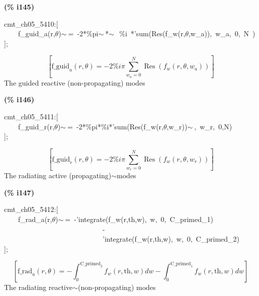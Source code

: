 \documentclass[fleqn]{article}
\begin{document}
\noindent
\begin{minipage}[t]{4.000000em}\color{red}\bfseries
(\% i145)	
\end{minipage}
\begin{minipage}[t]{\textwidth}\color{blue}
cmt\_ch05\_5410:[\\
\ \ \ \ f\_guid\_a(r,\ensuremath{\theta})\ensuremath{\sim\ }=\ -2*\%pi\ensuremath{\sim\ }*\ensuremath{\sim\ }\ \%i\ *'sum(Res(f\_w(r,\ensuremath{\theta},w\_a)),\ w\_a,\ 0,\ N\ )\\
];
\end{minipage}
\[\displaystyle \tag{\% o145} 
\left[ {{\ensuremath{\mathrm{f\_ guid}}}_a}\left( r\operatorname{,}\theta \right) =-2 \% i \ensuremath{\pi}  \sum_{{w_a}=0}^{N}{\left. \operatorname{Res}\left( {f_w}\left( r\operatorname{,}\theta \operatorname{,}{w_a}\right) \right) \right.}\right] \mbox{}
\]
The guided reactive (non-propagating) modes


\noindent
\begin{minipage}[t]{4.000000em}\color{red}\bfseries
(\% i146)	
\end{minipage}
\begin{minipage}[t]{\textwidth}\color{blue}
cmt\_ch05\_5411:[\\
\ \ \ \ f\_guid\_r(r,\ensuremath{\theta})\ensuremath{\sim\ }=\ -2*\%pi*\%i*'sum(Res(f\_w(r,\ensuremath{\theta},w\_r))\ensuremath{\sim\ },\ w\_r,\ 0,N)\\
];
\end{minipage}
\[\displaystyle \tag{\% o146} 
\left[ {{\ensuremath{\mathrm{f\_ guid}}}_r}\left( r\operatorname{,}\theta \right) =-2 \% i \ensuremath{\pi}  \sum_{{w_r}=0}^{N}{\left. \operatorname{Res}\left( {f_w}\left( r\operatorname{,}\theta \operatorname{,}{w_r}\right) \right) \right.}\right] \mbox{}
\]
The radiating active (propagating)\ensuremath{\sim }modes


\noindent
\begin{minipage}[t]{4.000000em}\color{red}\bfseries
(\% i147)	
\end{minipage}
\begin{minipage}[t]{\textwidth}\color{blue}
cmt\_ch05\_5412:[\\
\ \ \ \ f\_rad\_a(r,\ensuremath{\theta})\ensuremath{\sim\ }=\ -'integrate(f\_w(r,th,w),\ w,\ 0,\ C\_primed\_1)\\
\ \ \ \ \ \ \ \ \ \ \ \ \ \ \ \ \ \ \ \ \ \ \ \ \ \ \ \ -\\
\ \ \ \ \ \ \ \ \ \ \ \ \ \ \ \ \ \ \ \ \ \ \ \ \ \ \ \ 'integrate(f\_w(r,th,w),\ w,\ 0,\ C\_primed\_2)\\
];
\end{minipage}
\[\displaystyle \tag{\% o147} 
\left[ {{\ensuremath{\mathrm{f\_ rad}}}_a}\left( r\operatorname{,}\theta \right) =-\int_{0}^{{{\ensuremath{\mathrm{C\_ primed}}}_2}}{\left. {f_w}\left( r\operatorname{,}\ensuremath{\mathrm{th}}\operatorname{,}w\right) dw\right.}-\int_{0}^{{{\ensuremath{\mathrm{C\_ primed}}}_1}}{\left. {f_w}\left( r\operatorname{,}\ensuremath{\mathrm{th}}\operatorname{,}w\right) dw\right.}\right] \mbox{}
\]
The radiating reactive\ensuremath{\sim }(non-propagating) modes
\end{document}
